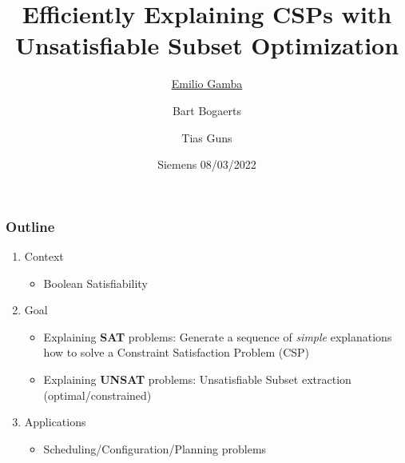 \documentclass{beamer}
\title{Efficiently Explaining CSPs with Unsatisfiable Subset Optimization}
\institute[shortinst]
{\inst{1} Vrije Universiteit Brussel, Belgium \\ %
	\inst{2} KULeuven, Belgium \\ %
	\href{mailto:emilio.gamba@vub.be}{\underline{emilio.gamba@vub.be}}, \href{mailto:bart.bogaerts@vub.be}{bart.bogaerts@vub.be}, \href{mailto:tias.guns@kuleuven.be}{tias.guns@kuleuven.be} %
}
\date{Siemens 08/03/2022}
\author{\underline{Emilio Gamba}\inst{1} \and  Bart Bogaerts\inst{1} \and   Tias Guns\inst{1,2}}
\begin{document}
	
	\begin{frame}
		\maketitle
	\end{frame}
	
	
	\begin{frame}
		\frametitle{Outline}
		
		\begin{enumerate}
			\item Context
			\begin{itemize}
				\item Boolean Satisfiability \pause
			\end{itemize}
			\item Goal
			\begin{itemize}
				\item Explaining \textbf{SAT} problems: Generate  a sequence of \emph{simple} explanations how to solve a Constraint Satisfaction Problem (CSP)\pause
				\item Explaining \textbf{UNSAT} problems: Unsatisfiable Subset extraction (optimal/constrained)
			\end{itemize}\pause
			\item Applications
			\begin{itemize}
				\item Scheduling/Configuration/Planning problems
			\end{itemize}

		\end{enumerate}
	\end{frame}
	
\end{document}
